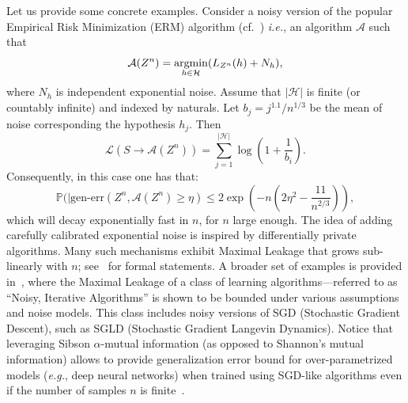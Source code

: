 \documentclass{article}
\numberwithin{theorem}{section}
\numberwithin{example}{section}
\numberwithin{remark}{section}
\numberwithin{definition}{section}
\newcommand{\argmin}{\operatornamewithlimits{argmin}}
\newcommand{\revised}[1]{{\color{black} #1}}
\begin{document}
\revised{Let us provide some concrete examples. Consider a noisy version of the popular Empirical Risk Minimization (ERM) algorithm (cf.~\cite[Corollary 5]{EspositoGI:2021}) \textit{i.e.}, an algorithm $\mathcal{A}$ such that
\begin{equation}
    \mathcal{A}(Z^n) = \argmin_{h\in\mathcal{H}}( L_{Z^n}(h)+N_h),
\end{equation}
where $N_h$ is independent exponential noise. Assume that $|\mathcal{H}|$ is finite (or countably infinite) and indexed by naturals. Let $b_j= j^{1.1}/n^{1/3}$ be the mean of noise corresponding the hypothesis $h_j$. Then $$\mathcal{L}(S\to\mathcal{A}(Z^n))=\sum_{j=1}^{|\mathcal{H}|} \log\left(1+\frac{1}{b_i}\right).$$ Consequently, in this case one has that:
$$\mathbb{P}(|\text{gen-err}(Z^n,\mathcal{A}(Z^n)\geq \eta) \leq 2\exp\left(-n\left(2\eta^2 - \frac{11}{n^{2/3}}\right)\right),$$
which will decay exponentially fast in $n$, for $n$ large enough. The idea of adding carefully calibrated exponential noise is inspired by differentially private algorithms. Many such mechanisms exhibit Maximal Leakage that grows sub-linearly with $n$; see~\cite[Lemmata 3,4,5, Corollary 12]{EspositoGI:2021} for formal statements. A broader set of examples is provided in~\cite{IssaEG:23}, where the Maximal Leakage of a class of learning algorithms—referred to as ``Noisy, Iterative Algorithms'' is shown to be bounded under various assumptions and noise models. This class includes noisy versions of SGD (Stochastic Gradient Descent), such as SGLD (Stochastic Gradient Langevin Dynamics).
} 
Notice that leveraging Sibson $\alpha$-mutual information (as opposed to Shannon's mutual information) allows to provide generalization error bound for over-parametrized models (\textit{e.g.}, deep neural networks) when trained using SGD-like algorithms even if the number of samples $n$ is finite~\cite{IssaEG:23}.
\end{document}
